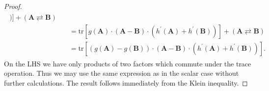\begin{proof}
\begin{align}
\begin{split}
    )
  ]
  +
  (\mathbf{A} \rightleftarrows \mathbf{B})
  \\
  &\quad=
  \mathrm{tr}
  [
    g(\mathbf{A})
    \cdot
    (
    \mathbf{A}
    -
    \mathbf{B}
    )
    \cdot
    (
    h^{'}(\mathbf{A})
    +
    h^{'}(\mathbf{B})
    )
  ]
  +
  (\mathbf{A} \rightleftarrows \mathbf{B})
  \\
  &\quad=
  \mathrm{tr}
  [
  (
    g(\mathbf{A})
    -
    g(\mathbf{B})
  )
    \cdot
    (
    \mathbf{A}
    -
    \mathbf{B}
    )
    \cdot
    (
    h^{'}(\mathbf{A})
    +
    h^{'}(\mathbf{B})
    )
  ].
    \end{split}
  \end{align}
  On the LHS we have only products of two factors which commute under the trace operation. Thus we may use the same expression as in the scalar case without further calculations.
  The result follows immediately from the Klein inequality.
\end{proof}

